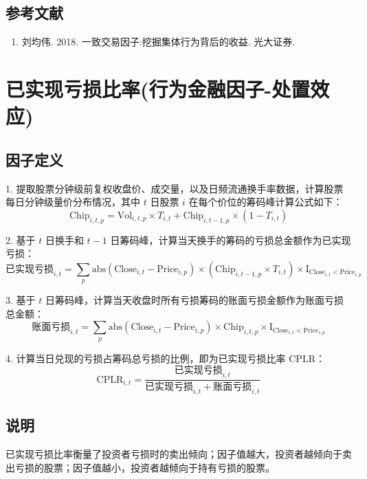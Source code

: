 \documentclass{article}
\begin{document}
\subsection{参考文献}
\begin{enumerate}
    \item 刘均伟. 2018. 一致交易因子:挖掘集体行为背后的收益. 光大证券.
\end{enumerate}

\section{已实现亏损比率(行为金融因子-处置效应)}

\subsection{因子定义}

1. 提取股票分钟级前复权收盘价、成交量，以及日频流通换手率数据，计算股票每日分钟级量价分布情况，其中 \( t \) 日股票 \( i \) 在每个价位的筹码峰计算公式如下：
\begin{equation}
    \mathrm{Chip}_{i,t,p} = \mathrm{Vol}_{i,t,p} \times T_{i,t} + \mathrm{Chip}_{i,t-1,p} \times (1 - T_{i,t})
\end{equation}

2. 基于 \( t \) 日换手和 \( t-1 \) 日筹码峰，计算当天换手的筹码的亏损总金额作为已实现亏损：
\begin{equation}
    \text{已实现亏损}_{i,t} = \sum_p \mathrm{abs}(\mathrm{Close}_{i,t} - \mathrm{Price}_{i,p}) \times (\mathrm{Chip}_{i,t-1,p} \times T_{i,t}) \times \mathrm{I}_{\mathrm{Close}_{i,t} < \mathrm{Price}_{i,p}}
\end{equation}

3. 基于 \( t \) 日筹码峰，计算当天收盘时所有亏损筹码的账面亏损金额作为账面亏损总金额：
\begin{equation}
    \text{账面亏损}_{i,t} = \sum_p \mathrm{abs}(\mathrm{Close}_{i,t} - \mathrm{Price}_{i,p}) \times \mathrm{Chip}_{i,t,p} \times \mathrm{I}_{\mathrm{Close}_{i,t} < \mathrm{Price}_{i,p}}
\end{equation}

4. 计算当日兑现的亏损占筹码总亏损的比例，即为已实现亏损比率 \( \mathrm{CPLR} \)：
\begin{equation}
    \mathrm{CPLR}_{i,t} = \frac{\text{已实现亏损}_{i,t}}{\text{已实现亏损}_{i,t} + \text{账面亏损}_{i,t}}
\end{equation}

\subsection{说明}
已实现亏损比率衡量了投资者亏损时的卖出倾向；因子值越大，投资者越倾向于卖出亏损的股票；因子值越小，投资者越倾向于持有亏损的股票。
\end{document}
